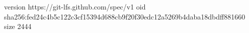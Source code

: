 version https://git-lfs.github.com/spec/v1
oid sha256:fed24c4b5c122c3cf15394d688cb9f20f30edc12a5269b4daba18dbdff881660
size 2444

